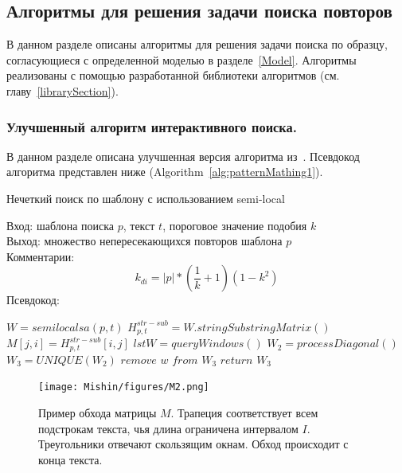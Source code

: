 \subsection{Алгоритмы для решения задачи поиска повторов}\label{fics}

В данном разделе описаны алгоритмы для решения задачи поиска по образцу, согласующиеся с определенной моделью в разделе~\ref{Model}.
Алгоритмы реализованы с помощью разработанной библиотеки алгоритмов (см. главу~\ref{librarySection}).

\subsubsection{Улучшенный алгоритм интерактивного поиска.}
В данном разделе описана улучшенная версия алгоритма из~\cite{luciv2019interactive}.
Псевдокод алгоритма представлен ниже (Algorithm~\ref{alg:patternMathing1}).

\begin{algorithm}[t!]
\caption{Нечеткий поиск по шаблону с использованием semi-local}\label{alg:patternMathing1}
Вход: шаблона поиска $p$, текст $t$, пороговое значение подобия $k$\\
Выход: множество непересекающихся повторов шаблона $p$\\
Комментарии:
\begin{equation}
    k_{di}=|p|*(\frac{1}{k}+1)(1-k^2)
\end{equation}
Псевдокод:
\begin{algorithmic}[1]
\State $W = semilocalsa(p,t)$
\State $ H^{str-sub}_{p,t} =  W.stringSubstringMatrix()$
\State $ M[j,i] = H^{str-sub}_{p,t}[i,j] $
\State $lstW = queryWindows()$
\State $W_2 = processDiagonal()$
\State $W_3 = UNIQUE(W_2)$
\State $remove$ $w$ $from$ $W_3$
\EndIf
\EndFor
\State $return$ $W_3$

\end{algorithmic}
\end{algorithm}

\begin{figure}[t!]
\centering
    \texttt{[image: Mishin/figures/M2.png]}
    \caption{Пример обхода матрицы $M$. Трапеция соответствует всем подстрокам текста, чья длина ограничена интервалом $I$. Треугольники отвечают скользящим окнам.
    Обход происходит с конца текста.
    }\label{passage}
\end{figure}

